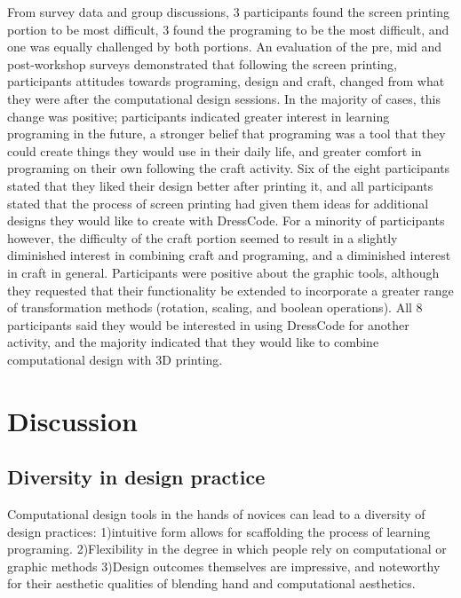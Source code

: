\documentclass{sigchi}
\begin{document}
From survey data and group discussions, 3 participants found the screen printing portion to be most difficult, 3 found the programing to be the most difficult, and one was equally challenged by both portions. An evaluation of the pre, mid and post-workshop surveys demonstrated that following the screen printing, participants attitudes towards programing, design and craft, changed from what they were after the computational design sessions. In the majority of cases, this change was positive; participants indicated greater interest in learning programing in the future, a stronger belief that programing was a tool that they could create things they would use in their daily life, and greater comfort in programing on their own following the craft activity. Six of the eight participants stated that they liked their design better after printing it, and all participants stated that the process of screen printing had given them ideas for additional designs they would like to create with DressCode. For a minority of participants however, the difficulty of the craft portion seemed to result in a slightly diminished interest in combining craft and programing, and a diminished interest in craft in general. Participants were positive about the graphic tools, although they requested that their functionality be extended to incorporate a greater range of transformation methods (rotation, scaling, and boolean operations). All 8 participants said they would be interested in using DressCode for another activity, and the majority indicated that they would like to combine computational design with 3D printing.

\section{Discussion}

\subsection{Diversity in design practice}
Computational design tools in the hands of novices can lead to a diversity of design practices: 
1)intuitive form allows for scaffolding the process of learning programing.
2)Flexibility in the degree in which people rely on computational or graphic methods
3)Design outcomes themselves are impressive, and noteworthy for their aesthetic qualities of blending hand and computational aesthetics.
\end{document}
